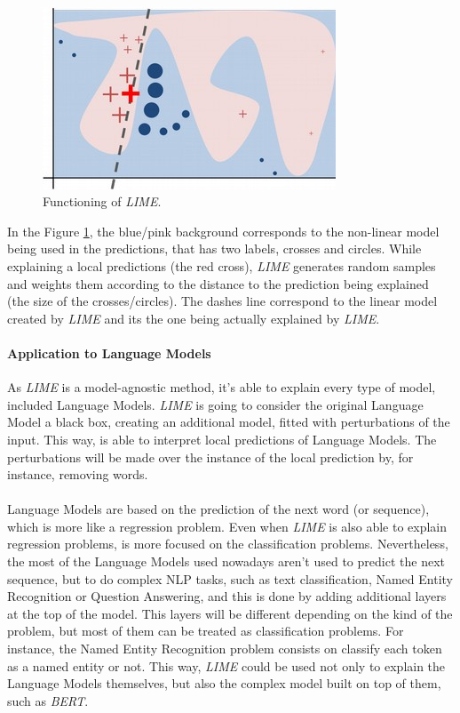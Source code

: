 \paragraph{}
\begin{figure}
	\centering
	\includegraphics[scale=0.55]{images/lime-explanation}
	\caption{Functioning of \emph{LIME}.}
	\label{fig:lime-ex}
\end{figure}
In the Figure \ref{fig:lime-ex}, the blue/pink background corresponds to the non-linear model being used in the predictions, that has two labels, crosses and circles. While explaining a local predictions (the red cross), \emph{LIME} generates random samples and weights them according to the distance to the prediction being explained (the size of the crosses/circles). The dashes line correspond to the linear model created by \emph{LIME} and its the one being actually explained by \emph{LIME}.

\paragraph{Application to Language Models}
As \emph{LIME} is a model-agnostic method, it's able to explain every type of model, included Language Models. \emph{LIME} is going to consider the original Language Model a black box, creating an additional model, fitted with perturbations of the input. This way, is able to interpret local predictions of Language Models. The perturbations will be made over the instance of the local prediction by, for instance, removing words. 
\paragraph{}
Language Models are based on the prediction of the next word (or sequence), which is more like a regression problem. Even when \emph{LIME} is also able to explain regression problems, is more focused on the classification problems. Nevertheless, the most of the Language Models used nowadays aren't used to predict the next sequence, but to do complex NLP tasks, such as text classification, Named Entity Recognition or Question Answering, and this is done by adding additional layers at the top of the model. This layers will be different depending on the kind of the problem, but most of them can be treated as classification problems. For instance, the Named Entity Recognition problem consists on classify each token as a named entity or not.  This way, \emph{LIME} could be used not only to explain the Language Models themselves, but also the complex model built on top of them, such as \emph{BERT}.

